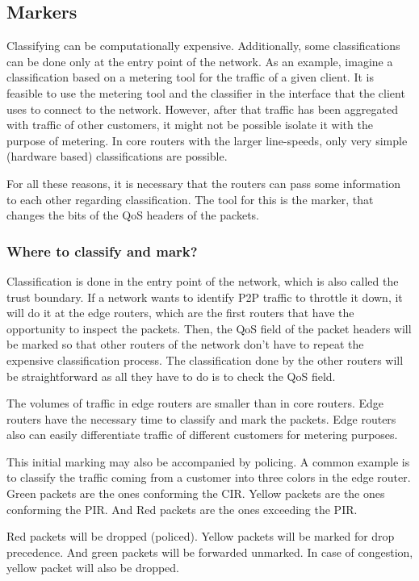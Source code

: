 \subsection{Markers}

Classifying can be computationally expensive.
Additionally, some classifications can be done only at the entry point of the network.
As an example, imagine a classification based on a metering tool for the traffic of a given client.
It is feasible to use the metering tool and the classifier in the interface that the client uses to connect to the network.
However, after that traffic has been aggregated with traffic of other customers, it might not be possible isolate it with the purpose of metering.
In core routers with the larger line-speeds, only very simple (hardware based) classifications are possible.

For all these reasons, it is necessary that the routers can pass some information to each other regarding classification.
The tool for this is the marker, that changes the bits of the QoS headers of the packets.

\subsubsection{Where to classify and mark?}

Classification is done in the entry point of the network, which is also called the trust boundary.
If a network wants to identify P2P traffic to throttle it down, it will do it at the edge routers, which are the first routers that have the opportunity to inspect the packets.
Then, the QoS field of the packet headers will be marked so that other routers of the network don't have to repeat the expensive classification process.
The classification done by the other routers will be straightforward as all they have to do is to check the QoS field.

The volumes of traffic in edge routers are smaller than in core routers.
Edge routers have the necessary time to classify and mark the packets.
Edge routers also can easily differentiate traffic of different customers for metering purposes.

This initial marking may also be accompanied by policing.
A common example is to classify the traffic coming from a customer into three colors in the edge router.
Green packets are the ones conforming the CIR.
Yellow packets are the ones conforming the PIR.
And Red packets are the ones exceeding the PIR.

Red packets will be dropped (policed).
Yellow packets will be marked for drop precedence.
And green packets will be forwarded unmarked.
In case of congestion, yellow packet will also be dropped.

